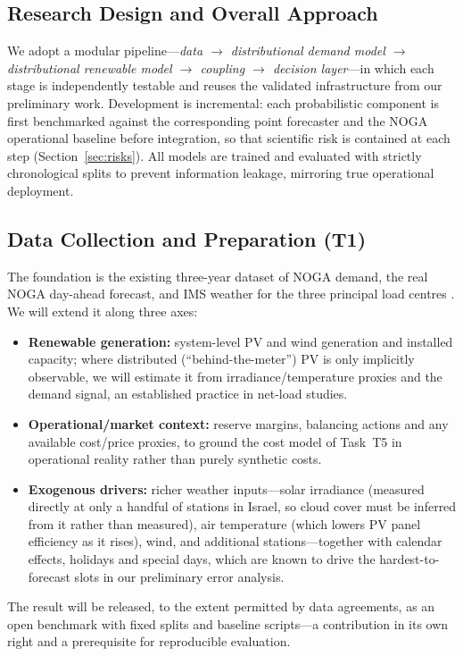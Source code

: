 \documentclass[12pt,a4paper]{article}
\begin{document}
\subsection{Research Design and Overall Approach}

We adopt a modular pipeline---\emph{data $\rightarrow$ distributional demand model
$\rightarrow$ distributional renewable model $\rightarrow$ coupling $\rightarrow$ decision
layer}---in which each stage is independently testable and reuses the validated
infrastructure from our preliminary work. Development is incremental: each probabilistic
component is first benchmarked against the corresponding point forecaster and the NOGA
operational baseline before integration, so that scientific risk is contained at each
step (Section~\ref{sec:risks}). All models are trained and evaluated with strictly
chronological splits to prevent information leakage, mirroring true operational deployment.

\subsection{Data Collection and Preparation (T1)}
\label{sec:data}

The foundation is the existing three-year dataset of NOGA demand, the real NOGA day-ahead
forecast, and IMS weather for the three principal load centres
\parencite{noga,ims}. We will extend it along three axes:
\begin{itemize}[leftmargin=1.4em]
    \item \textbf{Renewable generation:} system-level PV and wind generation and
        installed capacity; where distributed (``behind-the-meter'') PV is only implicitly
        observable, we will estimate it from irradiance/temperature proxies and the
        demand signal, an established practice in net-load studies.
    \item \textbf{Operational/market context:} reserve margins, balancing actions and any
        available cost/price proxies, to ground the cost model of Task~T5 in
        operational reality rather than purely synthetic costs.
    \item \textbf{Exogenous drivers:} richer weather inputs---solar irradiance (measured
        directly at only a handful of stations in Israel, so cloud cover must be inferred
        from it rather than measured), air temperature (which lowers PV panel efficiency as
        it rises), wind, and additional stations---together with calendar effects, holidays
        and special days, which are known to drive the hardest-to-forecast slots in our
        preliminary error analysis.
\end{itemize}
The result will be released, to the extent permitted by data agreements, as an open
benchmark with fixed splits and baseline scripts---a contribution in its own right and a
prerequisite for reproducible evaluation.
\end{document}
